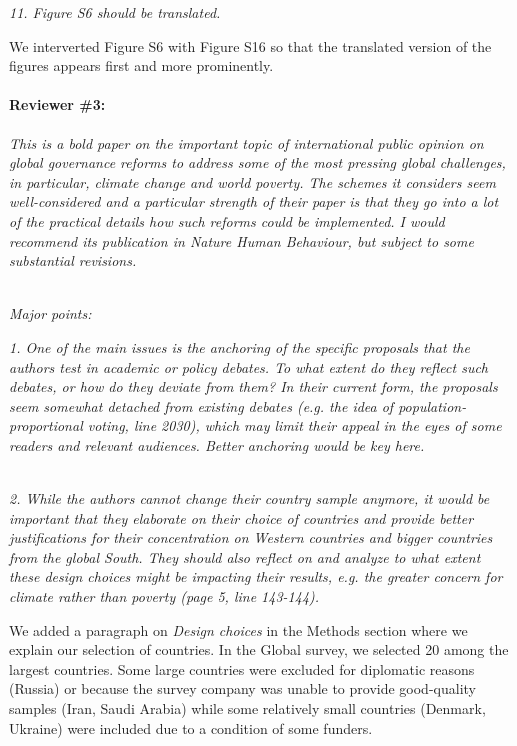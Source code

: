 \documentclass[12pt,english]{article}
\begin{document}
\textit{11. Figure S6 should be translated.}

We interverted Figure S6 with Figure S16 so that the translated version of the figures appears first and more prominently.
~\\

\paragraph*{Reviewer \#3:}
\textit{This is a bold paper on the important topic of international public opinion on global governance reforms to address some of the most pressing global challenges, in particular, climate change and world poverty. The schemes it considers seem well-considered and a particular strength of their paper is that they go into a lot of the practical details how such reforms could be implemented. I would recommend its publication in Nature Human Behaviour, but subject to some substantial revisions.}

~\\

\textit{Major points:}

\textit{1. One of the main issues is the anchoring of the specific proposals that the authors test in academic or policy debates. To what extent do they reflect such debates, or how do they deviate from them? In their current form, the proposals seem somewhat detached from existing debates (e.g. the idea of population-proportional voting, line 2030), which may limit their appeal in the eyes of some readers and relevant audiences. Better anchoring would be key here.}

~\\

\textit{2. While the authors cannot change their country sample anymore, it would be important that they elaborate on their choice of countries and provide better justifications for their concentration on Western countries and bigger countries from the global South. They should also reflect on and analyze to what extent these design choices might be impacting their results, e.g. the greater concern for climate rather than poverty (page 5, line 143-144).}

We added a paragraph on \textit{Design choices} in the Methods section where we explain our selection of countries. In the Global survey, we selected 20 among the largest countries. Some large countries were excluded for diplomatic reasons (Russia) or because the survey company was unable to provide good-quality samples (Iran, Saudi Arabia) while some relatively small countries (Denmark, Ukraine) were included due to a condition of some funders.
\end{document}
